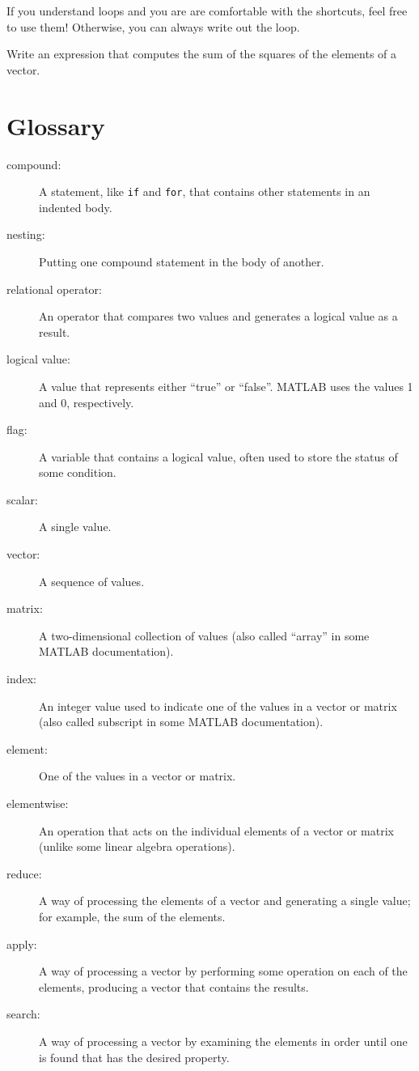 \documentclass[
]{book}
\begin{document}
If you understand loops and you are are comfortable with the
shortcuts, feel free to use them!  Otherwise, you can always write
out the loop.

\begin{ex}
Write an expression that computes the sum of the
squares of the elements of a vector.
\end{ex}


\section{Glossary}

\begin{description}

\item[compound:] A statement, like {\tt if} and {\tt for}, that
contains other statements in an indented body.

\item[nesting:] Putting one compound statement in the body of another.

\item[relational operator:] An operator that compares two values and
generates a logical value as a result.

\item[logical value:] A value that represents either ``true'' or
``false''.  MATLAB uses the values 1 and 0, respectively.

\item[flag:] A variable that contains a logical value, often used
to store the status of some condition.

\item[scalar:] A single value.

\item[vector:] A sequence of values.

\item[matrix:] A two-dimensional collection of values (also called
``array'' in some MATLAB documentation).

\item[index:] An integer value used to indicate one of the values
in a vector or matrix (also called subscript in some MATLAB documentation).

\item[element:] One of the values in a vector or matrix.

\item[elementwise:] An operation that acts on the individual elements
of a vector or matrix (unlike some linear algebra operations).

\item[reduce:] A way of processing the elements of a vector and
generating a single value; for example, the sum of the elements.

\item[apply:] A way of processing a vector by performing some operation
on each of the elements, producing a vector that contains the
results.

\item[search:] A way of processing a vector by examining the
elements in order until one is found that has the desired property.

\end{description}
\end{document}
